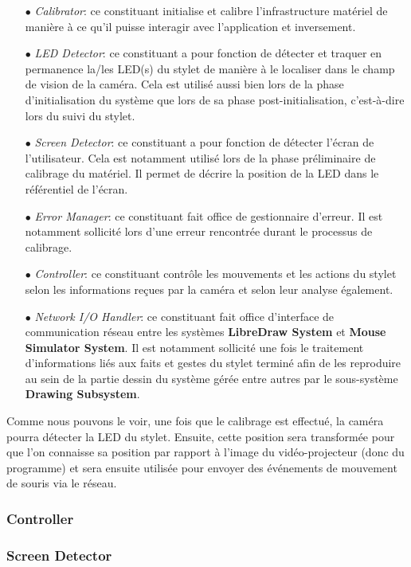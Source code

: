\documentclass[11pt,a4paper,oldfontcommands]{memoir}
\begin{document}
\begin{itemize}
\item[$\bullet$] \textit{Calibrator}: ce constituant initialise et calibre l'infrastructure matériel de manière à ce qu'il puisse interagir avec l'application et inversement.
\item[$\bullet$] \textit{LED Detector}: ce constituant a pour fonction de détecter et traquer en permanence la/les LED(s) du stylet de manière à le localiser dans le champ de vision de la caméra. Cela est utilisé aussi bien lors de la phase d'initialisation du système que lors de sa phase post-initialisation, c'est-à-dire lors du suivi du stylet.
\item[$\bullet$] \textit{Screen Detector}: ce constituant a pour fonction de détecter l'écran de l'utilisateur. Cela est notamment utilisé lors de la phase préliminaire de calibrage du matériel. Il permet de décrire la position de la LED dans le référentiel de l'écran.
\item[$\bullet$] \textit{Error Manager}: ce constituant fait office de gestionnaire d'erreur. Il est notamment sollicité lors d'une erreur rencontrée durant le processus de calibrage.
\item[$\bullet$] \textit{Controller}: ce constituant contrôle les mouvements et les actions du stylet selon les informations reçues par la caméra et selon leur analyse également.
\item[$\bullet$] \textit{Network I/O Handler}: ce constituant fait office d'interface de communication réseau entre les systèmes \textbf{LibreDraw System} et \textbf{Mouse Simulator System}. Il est notamment sollicité une fois le traitement d'informations liés aux faits et gestes du stylet terminé afin de les reproduire au sein de la partie dessin du système gérée entre autres par le sous-système \textbf{Drawing Subsystem}.
\end{itemize}

Comme nous pouvons le voir, une fois que le calibrage est effectué, la caméra pourra détecter la LED du stylet. Ensuite, cette position sera transformée pour que l'on connaisse sa position par rapport à l'image du vidéo-projecteur (donc du programme) et sera ensuite utilisée pour envoyer des événements de mouvement de souris via le réseau.

\subsubsection{Controller}

\subsubsection{Screen Detector}
\end{document}
